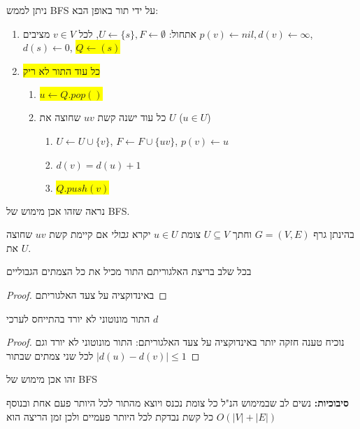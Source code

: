 ניתן לממש BFS על ידי תור באופן הבא:
\begin{enumerate}
\item
אתחול:
$U \leftarrow \{s\}, F \leftarrow \emptyset$, 
לכל 
$v \in V$
מציבים
$p(v) \leftarrow nil, d(v) \leftarrow \infty$,
$d(s) \leftarrow 0$,
\colorbox{yellow}{$Q \leftarrow (s)$}
\item 
\colorbox{yellow}{%
כל עוד התור לא ריק 
}
\begin{enumerate}
	\item
	\colorbox{yellow}{$u \leftarrow Q.pop()$}
\item
כל עוד ישנה קשת 
$uv$
שחוצה את $U$
($u \in U$)
		\begin{enumerate}
		\item
		$U \leftarrow U \cup \{v\}$,
		$F \leftarrow F \cup \{uv\}$,
		$p(v) \leftarrow u$
		\item
		$d(v) = d(u) + 1$
		\item
		\colorbox{yellow}{$Q.push(v)$}
		\end{enumerate}
	\end{enumerate}
\end{enumerate}
נראה שזהו אכן מימוש של BFS.
\begin{definition}
בהינתן גרף 
$G = (V,E)$
וחתך 
$U \subseteq V$
צומת 
$u \in U$
יקרא 
\emph{גבולי}
אם קיימת קשת $uv$ שחוצה את $U$.
\end{definition}

\begin{claim}
בכל שלב בריצת האלגוריתם התור מכיל את כל הצמתים הגבוליים
\end{claim}
\begin{proof}
באינדוקציה על צעד האלגוריתם 
\end{proof}

\begin{claim}
התור מונוטוני לא יורד בהתייחס לערכי 
$d$
\end{claim}
\begin{proof}
נוכיח טענה חזקה יותר באינדוקציה על צעד האלגוריתם: 
התור מונוטוני לא יורד וגם 
$|d(u) - d(v)| \leq 1$
לכל שני צמתים שבתור
\end{proof}

\begin{corollary}
זהו אכן מימוש של BFS
\end{corollary}

\textbf{סיבוכיות:}
נשים לב שבמימוש הנ"ל כל צומת נכנס ויוצא מהתור לכל היותר פעם אחת 
ובנוסף כל קשת נבדקת לכל היותר פעמיים ולכן זמן הריצה הוא 
$O(|V| + |E|)$

